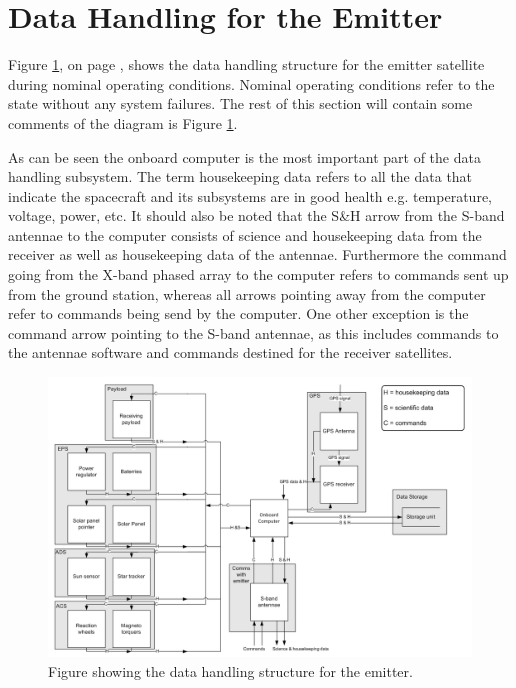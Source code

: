 \documentclass[11pt]{report}
\begin{document}
\section{Data Handling for the Emitter}
\label{DataHandlingEmitter}

Figure \ref{fig:DHE}, on page \pageref{fig:DHE}, shows the data handling structure for the emitter satellite during nominal operating conditions. Nominal operating conditions refer to the state without any system failures. The rest of this section will contain some comments of the diagram is Figure \ref{fig:DHE}.

As can be seen the onboard computer is the most important part of the data handling subsystem. The term housekeeping data refers to all the data that indicate the spacecraft and its subsystems are in good health e.g. temperature, voltage, power, etc. It should also be noted that the S\&H arrow from the S-band antennae to the computer consists of science and housekeeping data from the receiver as well as  housekeeping data of the antennae. Furthermore the command going from the X-band phased array to the computer refers to commands sent up from the ground station, whereas all arrows pointing away from the computer refer to commands being send by the computer. One other exception is the command arrow pointing to the S-band antennae, as this includes commands to the antennae software and commands destined for the receiver satellites.

\begin{figure}
\centering
\includegraphics[width=1.0\textwidth, angle=90]{img/DHReceiver.png}
\caption{Figure showing the data handling structure for the emitter.}
\label{fig:DHE}
\end{figure}


\end{document}
